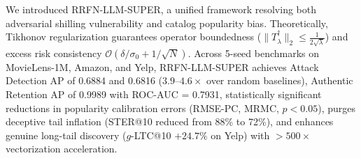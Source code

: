 \documentclass[10pt,journal]{IEEEtran}
\begin{document}
We introduced RRFN-LLM-SUPER, a unified framework resolving both adversarial shilling vulnerability and catalog popularity bias. Theoretically, Tikhonov regularization guarantees operator boundedness ($\|T^{\dagger}_\lambda\|_2 \le \frac{1}{2\sqrt{\lambda}}$) and excess risk consistency $\mathcal{O}(\delta/\sigma_0 + 1/\sqrt{N})$. Across 5-seed benchmarks on MovieLens-1M, Amazon, and Yelp, RRFN-LLM-SUPER achieves Attack Detection AP of 0.6884 and 0.6816 ($3.9$--$4.6\times$ over random baselines), Authentic Retention AP of 0.9989 with ROC-AUC = 0.7931, statistically significant reductions in popularity calibration errors (RMSE-PC, MRMC, $p < 0.05$), purges deceptive tail inflation (STER@10 reduced from 88\% to 72\%), and enhances genuine long-tail discovery ($g$-LTC@10 $+24.7\%$ on Yelp) with $>500\times$ vectorization acceleration.


{\footnotesize
\def\IEEEbibitemsep{0.5pt plus 0.5pt minus 0.3pt}
}
\end{document}
